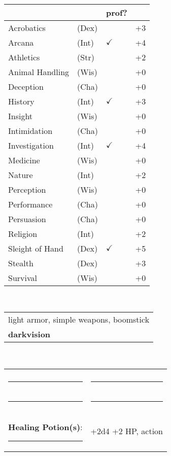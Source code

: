 \documentclass[twocolumn]{article}
\begin{document}
\\
\noindent\begin{tabular}{llll}
 & & prof? & \\
\hline
Acrobatics & (Dex) &  & +3 \\
Arcana & (Int) & $\checkmark$ & +4 \\ 
Athletics & (Str) &  & +2\\
Animal Handling & (Wis) &  & +0\\
Deception & (Cha) &  & +0\\
History & (Int) & $\checkmark$ & +3 \\
Insight & (Wis) &  & +0 \\
Intimidation & (Cha) &  & +0 \\
Investigation & (Int) & $\checkmark$ & +4 \\
Medicine & (Wis) &  & +0 \\
Nature & (Int) &  & +2 \\
Perception & (Wis) &  & +0 \\
Performance & (Cha) &  & +0 \\
Persuasion & (Cha) &  & +0 \\
Religion & (Int) &  & +2 \\
Sleight of Hand & (Dex) & $\checkmark$ & +5 \\
Stealth & (Dex) &  & +3 \\
Survival & (Wis) &  & +0 \\
\hline
\end{tabular}
\vspace{12pt}

\\
\noindent\begin{tabular}{|m{3.1in}|}
\hline
light armor, simple weapons, boomstick \\
\textbf{darkvision} \\
\hline
\end{tabular}
\vspace{12pt}


\\
\noindent\begin{tabular}{|ll|}
\hline&\\
\rule{1.4in}{.2pt}&\rule{1.4in}{.2pt}\\
\rule{1.4in}{.2pt}&\rule{1.4in}{.2pt}\\
\textbf{Healing Potion(s)}: \rule{.2in}{.2pt}& +2d4 +2 HP, {\sc action}\\
\hline
\end{tabular}
\vspace{12pt}
\end{document}
